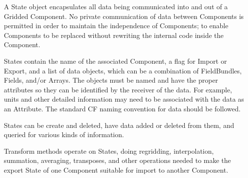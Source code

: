 %


A State object encapsulates all data being communicated into and
out of a Gridded Component.  No private communication
of data between Components is permitted in order to maintain the
independence of Components; to enable Components to be replaced
without rewriting the internal code inside the Component.

States contain the name of the associated Component, a flag for Import
or Export, and a list of data objects, which can be a combination of
FieldBundles, Fields, and/or Arrays.  The objects must be named and have
the proper attributes so they can be identified by the receiver of
the data.  For example, units and other detailed information
may need to be associated with the data as an Attribute.  
The standard CF naming convention for data should be followed.

States can be create and deleted, have data added or deleted from them,
and queried for various kinds of information.

Transform methods operate on States, doing regridding, interpolation,
summation, averaging, transposes, and other operations needed to
make the export State of one Component suitable for import to another
Component.
